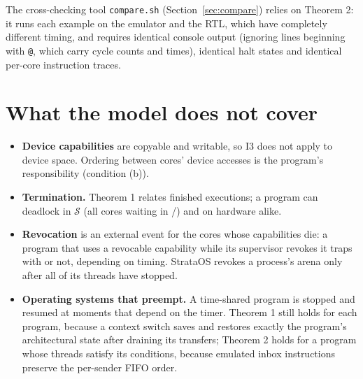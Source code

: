 The cross-checking tool \texttt{compare.sh} (Section~\ref{sec:compare}) relies on Theorem 2: it runs
each example on the emulator and the RTL, which have completely different timing, and requires
identical console output (ignoring lines beginning with \texttt{@}, which carry cycle counts and
times),
identical halt states and identical per-core instruction traces.

\section{What the model does not cover}
\begin{itemize}
\item \textbf{Device capabilities} are copyable and writable, so I3 does not apply to device space.
  Ordering between cores' device accesses is the program's responsibility (condition (b)).
\item \textbf{Termination.} Theorem 1 relates finished executions; a program can deadlock in
  $\mathcal{S}$ (all cores waiting in /) and on hardware alike.
\item \textbf{Revocation} is an external event for the cores whose capabilities die: a program that
  uses a revocable capability while its supervisor revokes it traps with  or
  not, depending on timing. StrataOS revokes a process's arena only after all of its threads have
  stopped.
\item \textbf{Operating systems that preempt.} A time-shared program is stopped and resumed at moments
  that depend on the timer. Theorem 1 still holds for each program, because a context switch saves and
  restores exactly the program's architectural state after draining its transfers; Theorem 2 holds for
  a program whose threads satisfy its conditions, because emulated inbox instructions preserve the
  per-sender FIFO order.
\end{itemize}
